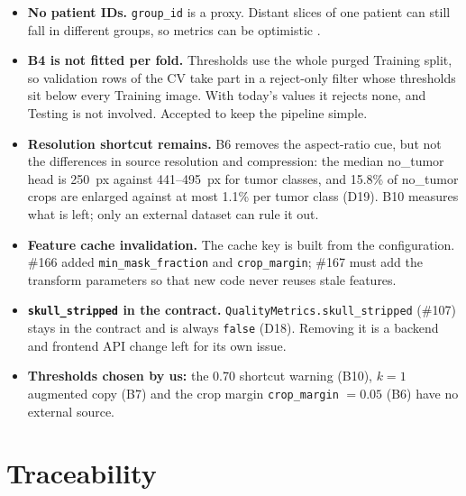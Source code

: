 \documentclass[11pt,a4paper]{article}
\newcommand{\board}[1]{\textsf{\##1}}
\begin{document}
\begin{itemize}
  \item \textbf{No patient IDs.} \texttt{group\_id} is a proxy. Distant slices of one patient can still fall in different groups, so metrics can be optimistic \cite{r3}.
  \item \textbf{B4 is not fitted per fold.} Thresholds use the whole purged Training split, so validation rows of the CV take part in a reject-only filter whose thresholds sit below every Training image. With today's values it rejects none, and Testing is not involved. Accepted to keep the pipeline simple.
  \item \textbf{Resolution shortcut remains.} B6 removes the aspect-ratio cue, but not the differences in source resolution and compression: the median no\_tumor head is 250~px against 441--495~px for tumor classes, and 15.8\% of no\_tumor crops are enlarged against at most 1.1\% per tumor class (D19). B10 measures what is left; only an external dataset can rule it out.
  \item \textbf{Feature cache invalidation.} The cache key is built from the configuration. \board{166} added \texttt{min\_mask\_fraction} and \texttt{crop\_margin}; \board{167} must add the transform parameters so that new code never reuses stale features.
  \item \textbf{\texttt{skull\_stripped} in the contract.} \texttt{QualityMetrics.skull\_stripped} (\board{107}) stays in the contract and is always \texttt{false} (D18). Removing it is a backend and frontend API change left for its own issue.
  \item \textbf{Thresholds chosen by us:} the 0.70 shortcut warning (B10), $k=1$ augmented copy (B7) and the crop margin \texttt{crop\_margin} $=0.05$ (B6) have no external source.
\end{itemize}

\section{Traceability}
\end{document}
